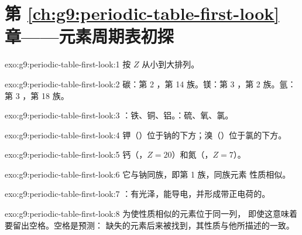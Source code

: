  \section*{第 \ref{ch:g9:periodic-table-first-look} 章——元素周期表初探}

\begin{solution}{exo:g9:periodic-table-first-look:1}
按 $Z$ 从小到大排列。
\end{solution}

\begin{solution}{exo:g9:periodic-table-first-look:2}
碳：第 2 ，第 14 族。镁：第 3 ，第 2 族。氩：
第 3 ，第 18 族。
\end{solution}

\begin{solution}{exo:g9:periodic-table-first-look:3}
：铁、铜、铝。：硫、氧、氯。
\end{solution}

\begin{solution}{exo:g9:periodic-table-first-look:4}
钾（）位于钠的下方；溴（）位于氯的下方。
\end{solution}

\begin{solution}{exo:g9:periodic-table-first-look:5}
钙（，$Z = 20$）和氮（，$Z = 7$）。
\end{solution}

\begin{solution}{exo:g9:periodic-table-first-look:6}
它与钠同族，即第 1 族，同族元素
性质相似。
\end{solution}

\begin{solution}{exo:g9:periodic-table-first-look:7}
：有光泽，能导电，并形成带正电荷的。
\end{solution}

\begin{solution}{exo:g9:periodic-table-first-look:8}
为使性质相似的元素位于同一列，
即使这意味着要留出空格。空格是预测：
缺失的元素后来被找到，其性质与他所描述的一致。
\end{solution}

